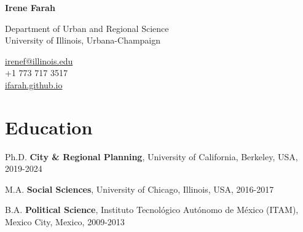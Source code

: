 \documentclass[12pt,letterpaper]{report}
\newcommand{\myname}{Irene Farah}
\newcommand{\namefont}[1]{{\normalfont\bfseries\Huge{#1}}}
\begin{document}
    \raggedright{}

    \namefont{\myname}

    \vspace{1em}
    \begin{minipage}[t]{0.700\textwidth}
        Department of Urban and Regional Science \\
        University of Illinois, Urbana-Champaign
    \end{minipage}
    \begin{minipage}[t]{0.295\textwidth}
        \flushright{}
        \href{mailto:irenef@berkeley.edu}{irenef@illinois.edu} \\
        +1 773 717 3517 \\
        \href{https://ifarah.github.io}{ifarah.github.io}\\
    \end{minipage}

    \section*{Education}
    
    \begin{tablist}
      \item[Ph.D.] \tab{}\textbf{City \& Regional Planning}, University of California, Berkeley, USA, 2019-2024 \\
\vspace{.15cm}
\color{gray}
\color{black}
      \item[M.A.] \tab{}\textbf{Social Sciences}, University of Chicago, Illinois, USA, 2016-2017 \\
\color{gray}
\vspace{.15cm}
      \color{black}
      \item[B.A.] \tab{}\textbf{Political Science}, Instituto Tecnológico Autónomo de México (ITAM), Mexico City, Mexico, 2009-2013 \\
\color{gray}
\vspace{.15cm}
    \end{tablist}
\end{document}
